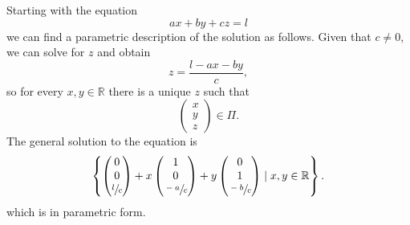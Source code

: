 Starting with the equation
\[ax+by+cz=l\]
we can find a parametric description of the solution as follows. Given that $c\neq0$, we can solve for $z$ and obtain
\[z=\dfrac{l-ax-by}c,\]
so for every $x,y\in\mathbb R$ there is a unique $z$ such that
\[
    \begin{pmatrix}
        x\\y\\z
    \end{pmatrix}
    \in\Pi.
\]
The general solution to the equation is
\[
    \left\{
        \begin{pmatrix}
            0\\0\\\sfrac lc
        \end{pmatrix}
        +x
        \begin{pmatrix}
            1\\0\\\sfrac{-a}c
        \end{pmatrix}
        +y
        \begin{pmatrix}
            0\\1\\\sfrac{-b}c
        \end{pmatrix}
        \mid x,y\in\mathbb R
    \right\}.
\]
which is in parametric form.

